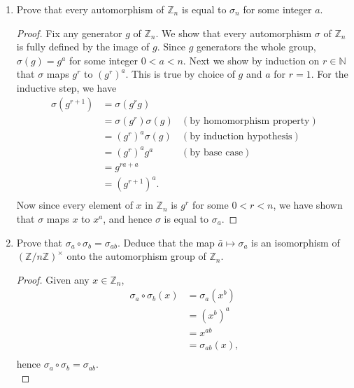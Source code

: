 \documentclass{article}
\begin{document}
\begin{enumerate}
\begin{enumerate}
\begin{enumerate}
          \item Prove that every automorphism of $\mathbb{Z}_n$ is equal to
            $\sigma_n$ for some integer $a$. \label{qn:auto}
            \begin{proof}
              Fix any generator $g$ of $\mathbb{Z}_n$. We show that every
              automorphism $\sigma$ of $\mathbb{Z}_n$ is fully defined by
              the image of $g$. Since $g$ generators the whole group,
              $\sigma(g)=g^a$ for some integer $0<a<n$. Next we show by
              induction on $r\in\mathbb{N}$ that $\sigma$ maps $g^r$ to
              $(g^r)^a$. This is true by choice of $g$ and $a$ for $r=1$.
              For the inductive step, we have
              \begin{align*}
                \sigma(g^{r+1}) &= \sigma(g^rg) \\
                                &= \sigma(g^r)\sigma(g) & (\text{by
                                homomorphism property}) \\
                                &= (g^r)^a\sigma(g)     & (\text{by induction
                                hypothesis}) \\
                                &= (g^r)^ag^a           & (\text{by
                                base case}) \\
                                &= g^{ra+a}             & \\
                                &= (g^{r+1})^a.         & \\
              \end{align*}
              Now since every element of $x$ in $\mathbb{Z}_n$ is $g^r$ for
              some $0<r<n$, we have shown that $\sigma$ maps $x$ to $x^a$,
              and hence $\sigma$ is equal to $\sigma_a$.
            \end{proof}

          \item Prove that $\sigma_a\circ\sigma_b=\sigma_{ab}$. Deduce that
            the map $\bar{a}\mapsto\sigma_a$ is an isomorphism of
            $(\mathbb{Z}/n\mathbb{Z})^\times$ onto the automorphism group
            of $\mathbb{Z}_n$.

            \begin{proof}
              Given any $x\in\mathbb{Z}_n$,
              \begin{align*}
                \sigma_a\circ\sigma_b(x)  &= \sigma_a(x^b)  \\
                                          &= (x^b)^a        \\
                                          &= x^{ab}         \\
                                          &= \sigma_{ab}(x),\\
              \end{align*}
              hence $\sigma_a\circ\sigma_b=\sigma_{ab}$. \\


\end{proof}
\end{enumerate}
\end{enumerate}
\end{enumerate}
\end{document}
